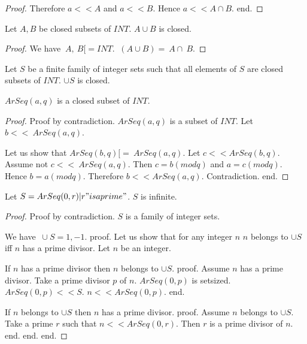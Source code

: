 \documentclass{article}
\begin{document}
\begin{forthel}
\begin{proof}
        Therefore $a << A$ and $a << B$. Hence $a << A \cap B$.
      end.
    \end{proof}

    \begin{lemma}[UnionClosed]
      Let $A,B$ be closed subsets of $INT$. $A \cup B$ is closed.
    \end{lemma}
    \begin{proof}
      We have $~A,~B [= INT$. $~(A \cup B) = ~A \cap ~B$.
    \end{proof}

    \begin{axiom}[UnionSClosed]
      Let $S$ be a finite family of integer sets such that all elements of $S$ are closed subsets of $INT$. $\cup S$ is closed.
    \end{axiom}

    \begin{lemma}[ArSeqClosed]
      $ArSeq(a,q)$ is a closed subset of $INT$.
    \end{lemma}
    \begin{proof}
      Proof by contradiction. $ArSeq(a,q)$ is a subset of $INT$. Let $b << ~ArSeq (a,q)$.

      Let us show that $ArSeq(b,q) [= ~ArSeq(a,q)$. Let $c << ArSeq(b,q)$.
        Assume not $c << ~ArSeq(a,q)$. Then $c = b (mod q)$ and $a = c (mod q)$. Hence $b = a (mod q)$. Therefore $b << ArSeq(a,q)$. Contradiction.
      end.
    \end{proof}

    \begin{theorem}[Fuerstenberg]
      Let $S = {ArSeq(0,r) | r "is a prime"}$. $S$ is infinite.
    \end{theorem}
    \begin{proof}
      Proof by contradiction. $S$ is a family of integer sets.

      We have $~ \cup S = {1, -1}$.
      proof.
        Let us show that for any integer $n$ $n$ belongs to $\cup S$ iff $n$ has a prime divisor.
          Let $n$ be an integer.

          If $n$ has a prime divisor then $n$ belongs to $\cup S$.
          proof.
            Assume $n$ has a prime divisor. Take a prime divisor $p$ of $n$. $ArSeq(0,p)$ is setsized. $ArSeq(0,p) << S$. $n << ArSeq(0,p)$.
          end.

          If $n$ belongs to $\cup S$ then $n$ has a prime divisor.
          proof.
            Assume $n$ belongs to $\cup S$. Take a prime $r$ such that $n << ArSeq(0,r)$. Then $r$ is a prime divisor of $n$.
          end.
        end.
      end.


\end{proof}
\end{forthel}
\end{document}
